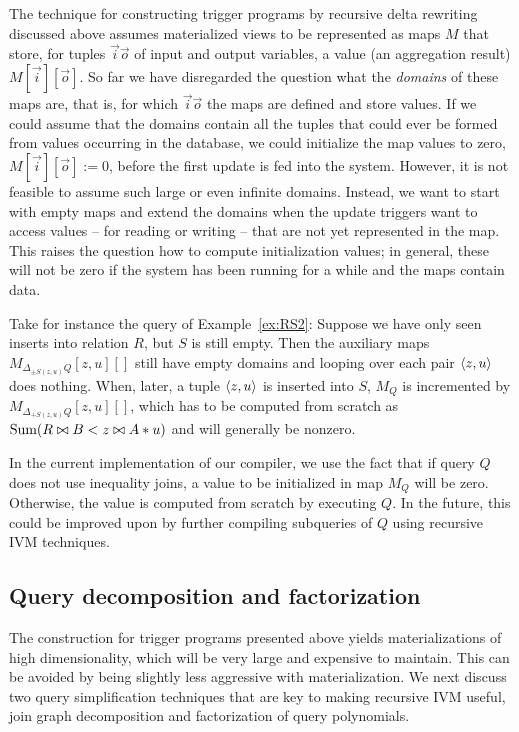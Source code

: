 The technique for constructing trigger programs by recursive delta rewriting discussed above assumes
materialized views to be represented as maps $M$ that store, for tuples $\vec{i}\vec{o}$ of input and output variables, a value (an aggregation result) $M[\vec{i}][\vec{o}]$.
So far we have disregarded the question what the {\em domains} of these maps are, that is,
for which $\vec{i}\vec{o}$ the maps are defined and store values.
If we could assume that the domains contain all the tuples that could ever be formed from values occurring
in the database, we could initialize the map values to zero, $M[\vec{i}][\vec{o}] := 0$,
before the first update is fed into the system.
%
However, it is not feasible to assume such large or even infinite domains.
Instead, we want to start with empty maps and extend the domains when the update triggers want to access
values -- for reading or writing -- that are not yet represented in the map.
This raises the question how to compute initialization values; in general, these will not be zero if 
the system has been running for a while and the maps contain data.

Take for instance the query of Example~\ref{ex:RS2}: Suppose we have only seen inserts into relation $R$,
but $S$ is still empty. Then the auxiliary maps $M_{\Delta_{\pm S(z,u)} Q}[z,u][]$ still have empty domains and
looping over each pair ${\langle z,u\rangle}$ does nothing. When, later, a tuple ${\langle z,u\rangle}$ is inserted into $S$,
$M_Q$ is incremented by $M_{\Delta_{+S(z,u)} Q}[z,u][]$, which has to be computed from scratch as
$\mbox{Sum}(R \bowtie B < z \bowtie A*u)$ and will generally be nonzero.

In the current implementation of our compiler, we use the fact that if query $Q$ does not use inequality joins,
a value to be initialized in map $M_Q$
will be zero. Otherwise, the value is computed from scratch by executing $Q$.
In the future, this could be improved upon by further compiling subqueries of $Q$ using
recursive IVM techniques.


\subsection{Query decomposition and factorization}
\label{sec:simplification}


The construction for trigger programs presented above yields 
materializations of high dimensionality, which will be very large and expensive to maintain.
This can be avoided by being slightly less aggressive with materialization.
We next discuss two query simplification techniques that are key to making
recursive IVM useful, join graph decomposition and factorization of query polynomials.


